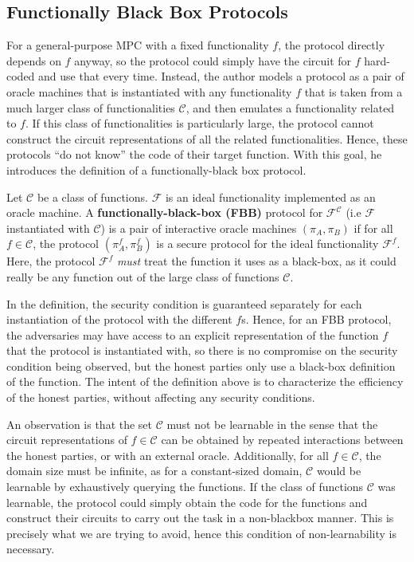 \documentclass[11pt]{article}
\theoremstyle{theorem}
\theoremstyle{theorem}
\theoremstyle{remark}
\theoremstyle{note}
\theoremstyle{plain}
\theoremstyle{definition}
\begin{document}
\subsection{Functionally Black Box Protocols}
For a general-purpose MPC with a fixed functionality $f$, the protocol directly depends on $f$ anyway, so the protocol could simply have the circuit for $f$ hard-coded and use that every time. Instead, the author models a protocol as a pair of oracle machines that is instantiated with any functionality $f$ that is taken from a much larger class of functionalities $\mathcal{C}$, and then emulates a functionality related to $f$. If this class of functionalities is particularly large, the protocol cannot construct the circuit representations of all the related functionalities. Hence, these protocols ``do not know'' the code of their target function. With this goal, he introduces the definition of a functionally-black box protocol.

Let $\mathcal{C}$ be a class of functions. $\mathcal{F}$ is an ideal functionality implemented as an oracle machine. A \textbf{functionally-black-box (FBB)} protocol for $\mathcal{F}^\mathcal{C}$ (i.e  $\mathcal{F}$ instantiated with $\mathcal{C}$) is a pair of interactive oracle machines $(\pi_A, \pi_B)$  if for all $f \in \mathcal{C}$, the protocol $(\pi^f_A, \pi^f_B)$ is a secure protocol for the ideal functionality $\mathcal{F}^f$. Here, the protocol $\mathcal{F}^f$ \textit{must} treat the function it uses as a black-box, as it could really be any function out of the large class of functions $\mathcal{C}$. 

In the definition, the security condition is guaranteed separately for each instantiation of the protocol with the different $f$s. Hence, for an FBB protocol, the adversaries may have access to an explicit representation of the function $f$ that the protocol is instantiated with, so there is no compromise on the security condition being observed, but the honest parties only use a black-box definition of the function. The intent of the definition above is to characterize the efficiency of the honest parties, without affecting any security conditions.

An observation is that the set $\mathcal{C}$ must not be learnable in the sense that the circuit representations of  $f \in \mathcal{C}$ can be obtained by repeated interactions between the honest parties, or with an external oracle. Additionally, for all $f \in \mathcal{C}$, the domain size must be infinite, as for a constant-sized domain, $\mathcal{C}$ would be learnable by exhaustively querying the functions. If the class of functions $\mathcal{C}$ was learnable, the protocol could simply obtain the code for the functions and construct their circuits to carry out the task in a non-blackbox manner. This is precisely what we are trying to avoid, hence this condition of non-learnability is necessary.
\end{document}
